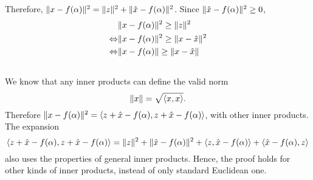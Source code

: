 Therefore, $\lVert x - f(\alpha) \rVert^2 = \lVert z \rVert^2 + \lVert \hat{x} - f(\alpha) \rVert^2$. Since $\lVert \hat{x}-f(\alpha) \rVert^2 \geq 0$,
\begin{align*}
	&\lVert x - f(\alpha) \rVert^2 \geq \lVert z \rVert^2 \\
	\Leftrightarrow &\lVert x - f(\alpha) \rVert^2 \geq \lVert x - \hat{x} \rVert^2 \\
	\Leftrightarrow &\lVert x - f(\alpha) \rVert \geq \lVert x - \hat{x} \rVert
\end{align*}

\subsection{}
We know that any inner products can define the valid norm
\[\lVert x \rVert = \sqrt{\langle x, x \rangle}.\]
Therefore $\lVert x - f(\alpha) \rVert^2  = \langle z+\hat{x}-f(\alpha), z+\hat{x}-f(\alpha) \rangle$, with other inner products. The expansion
\[\langle z+\hat{x}-f(\alpha), z+\hat{x}-f(\alpha) \rangle = \lVert z \rVert^2 + \lVert \hat{x} - f(\alpha) \rVert^2 + \langle z, \hat{x}-f(\alpha) \rangle + \langle \hat{x}-f(\alpha), z \rangle\]
also uses the properties of general inner products. Hence, the proof holds for other kinds of inner products, instead of only standard Euclidean one.